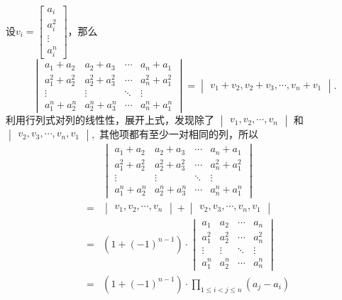 \item[(3)] 设$v_i = \begin{bmatrix} a_i \\ a_i^2\\ \vdots\\ a_i^n\end{bmatrix}$，那么
$$\begin{vmatrix} a_1 + a_2 & a_2 + a_3 & \cdots & a_n + a_1 \\ a_1^2 + a_2^2 & a_2^2 + a_3^2 & \cdots & a_n^2 + a_1^2 \\ \vdots & \vdots & \ddots & \vdots \\ a_1^n + a_2^n & a_2^n + a_3^n & \cdots & a_n^n + a_1^n \end{vmatrix} = \begin{vmatrix} v_1 + v_2, v_2 + v_3, \cdots, v_n + v_1 \end{vmatrix}.$$
利用行列式对列的线性性，展开上式，发现除了 $\begin{vmatrix} v_1, v_2, \cdots, v_n\end{vmatrix}$ 和 $\begin{vmatrix} v_2, v_3, \cdots, v_n, v_1\end{vmatrix},$ 其他项都有至少一对相同的列，所以
\begin{eqnarray*}
& & \begin{vmatrix} a_1 + a_2 & a_2 + a_3 & \cdots & a_n + a_1 \\ a_1^2 + a_2^2 & a_2^2 + a_3^2 & \cdots & a_n^2 + a_1^2 \\ \vdots & \vdots & \ddots & \vdots \\ a_1^n + a_2^n & a_2^n + a_3^n & \cdots & a_n^n + a_1^n \end{vmatrix} \\
& = & \begin{vmatrix} v_1, v_2, \cdots, v_n\end{vmatrix} + \begin{vmatrix} v_2, v_3, \cdots, v_n, v_1\end{vmatrix} \\
& = & (1 + (-1)^{n-1}) \cdot \begin{vmatrix} a_1 & a_2& \cdots & a_n \\ a_1^2 & a_2^2 & \cdots & a_n^2 \\ \vdots & \vdots & \ddots & \vdots \\ a_1^n & a_2^n & \cdots & a_n^n \end{vmatrix} \\
& = & (1 + (-1)^{n-1}) \cdot \prod\limits_{1\leqslant i < j \leqslant n}(a_j - a_i)
\end{eqnarray*}

